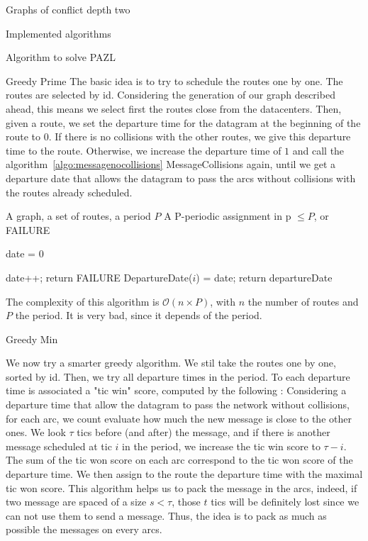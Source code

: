 \documentclass[10pt]{article}
\begin{document}
\begin{section}{Graphs of conflict depth two}
\begin{subsection}{Implemented algorithms}
  \begin{subsubsection}{Algorithm to solve PAZL }

  

   
  \begin{paragraph}{Greedy Prime}
  The basic idea is to try to schedule the routes one by one. The routes are selected by id. Considering the generation of our graph described ahead, this means we select first the routes close from the datacenters.  Then, given a route, we set the departure time for the datagram at the beginning of the route to $0$. If there is no collisions with the other routes, we give this departure time to the route. Otherwise, we increase the departure time of $1$ and call the algorithm~\ref{algo:messagenocollisions} MessageCollisions again, until we get a departure date that allows the datagram to pass the arcs without collisions with the routes already scheduled.

   	\begin{algorithm}[H]
 	\caption{Greedy Prime}
	\label{algo:greedyprime}
 	\begin{algorithmic}
 	\REQUIRE A graph, a set of routes, a period $P$
	\ENSURE A P-periodic assignment in p $\leq P$, or FAILURE

	\STATE date = $0$
	
 	
 	\STATE date++;
	\STATE return FAILURE
	\ENDIF
 	\ENDWHILE
	\STATE DepartureDate($i$) = date;
 	\ENDFOR
	\STATE return departureDate
 	\end{algorithmic}
 	\end{algorithm}
 	The complexity of this algorithm is $\mathcal{O}(n\times P)$, with $n$ the number of routes and $P$ the period. It is very bad, since it depends of the period.
  \end{paragraph}
    \begin{paragraph}{Greedy Min}
  
  We now try a smarter greedy algorithm. We stil take the routes one by one, sorted by id. Then, we try all departure times in the period. To each departure time is associated a "tic win" score, computed by the following : Considering a departure time that allow the datagram to pass the network without collisions, for each arc, we count evaluate how much the new message is close to the other ones. We look $\tau$ tics before (and after) the message, and if there is another message scheduled at tic $i$ in the period, we increase the tic win score to $\tau -i$.
  The sum of the tic won score on each arc correspond to the tic won score of the departure time. We then assign to the route the departure time with the maximal tic won score.
  This algorithm helps us to pack the message in the arcs, indeed, if two message are spaced of a size $s < \tau$, those $t$ tics will be definitely lost since we can not use them to send a message. Thus, the idea is to pack as much as possible the messages on every arcs.
  

\end{paragraph}
\end{subsubsection}
\end{subsection}
\end{section}
\end{document}
